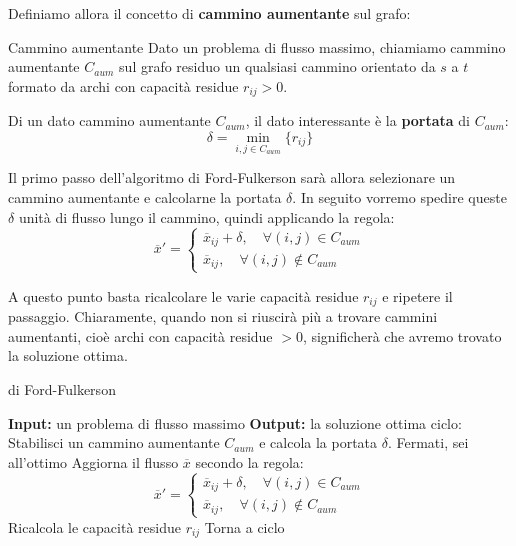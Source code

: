 \documentclass[a4paper,11pt]{article}
\begin{document}
Definiamo allora il concetto di \textbf{cammino aumentante} sul grafo:
\begin{definition}{Cammino aumentante}
Dato un problema di flusso massimo, chiamiamo cammino aumentante $C_{aum}$ sul grafo residuo un qualsiasi cammino orientato da $s$ a $t$ formato da archi con capacità residue $r_{ij} > 0$.
\end{definition}

Di un dato cammino aumentante $C_{aum}$, il dato interessante è la \textbf{portata} di $C_{aum}$:
$$
\delta = \min_{i,j \in C_{aum}} \{ r_{ij} \}
$$

Il primo passo dell'algoritmo di Ford-Fulkerson sarà allora selezionare un cammino aumentante e calcolarne la portata $\delta$.
In seguito vorremo spedire queste $\delta$ unità di flusso lungo il cammino, quindi applicando la regola:
\[
	\overline{x}' = 	
	\begin{cases}
		\overline{x}_{ij} + \delta, \quad \forall (i, j) \in C_{aum} \\ 
		\overline{x}_{ij}, \quad \forall (i, j) \notin C_{aum}
	\end{cases}
\]

A questo punto basta ricalcolare le varie capacità residue $r_{ij}$ e ripetere il passaggio.
Chiaramente, quando non si riuscirà più a trovare cammini aumentanti, cioè archi con capacità residue $> 0$, significherà che avremo trovato la soluzione ottima. 

\begin{algorithm}[H]
\caption{di Ford-Fulkerson}
\begin{algorithmic}
	\STATE \textbf{Input:} un problema di flusso massimo
	\STATE \textbf{Output:} la soluzione ottima
	\STATE \textsf{ciclo:}
	\STATE Stabilisci un cammino aumentante $C_{aum}$ e calcola la portata $\delta$.
		\STATE Fermati, sei all'ottimo
	\ENDIF
	\STATE Aggiorna il flusso $\overline{x}$ secondo la regola:
	\[
		\overline{x}' = 	
		\begin{cases}
			\overline{x}_{ij} + \delta, \quad \forall (i, j) \in C_{aum} \\ 
			\overline{x}_{ij}, \quad \forall (i, j) \notin C_{aum}
		\end{cases}
	\]
	\STATE Ricalcola le capacità residue $r_{ij}$
	\STATE Torna a \textsf{ciclo}
\end{algorithmic}
\end{algorithm}
\end{document}
